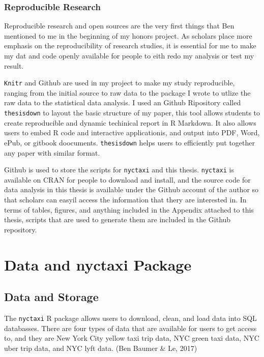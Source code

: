 \documentclass[12pt,twoside]{reedthesis}
\theoremstyle{definition}
\theoremstyle{definition}
\theoremstyle{definition}
\theoremstyle{remark}
\begin{document}
\subsection{Reproducible Research}\label{reproducible-research}

Reproducible research and open sources are the very first things that
Ben mentioned to me in the beginning of my honors project. As scholars
place more emphasis on the reproducibility of research studies, it is
essential for me to make my dat and code openly available for people to
eith redo my analysis or test my result.

\texttt{Knitr} and Github are used in my project to make my study
reproducible, ranging from the initial source to raw data to the package
I wrote to utlize the raw data to the statistical data analysis. I used
an Github Ripository called \texttt{thesisdown} to layout the basic
structure of my paper, this tool allows students to create reproducible
and dynamic techinical report in R Markdown. It also allows users to
embed R code and interactive applicationis, and output into PDF, Word,
ePub, or gitbook doocuments. \texttt{thesisdown} helps users to
efficiently put together any paper with similar format.

Github is used to store the scripts for \texttt{nyctaxi} and this
thesis. \texttt{nyctaxi} is available on CRAN for people to download and
install, and the source code for data analysis in this thesis is
available under the Github account of the author so that scholars can
easyil access the information that thery are interested in. In terms of
tables, figures, and anything included in the Appendix attached to this
thesis, scripts that are used to generate them are included in the
Github repository.

\chapter{Data and nyctaxi Package}\label{chapter2}

\section{Data and Storage}\label{data-and-storage}

The \texttt{nyctaxi} R package allows users to download, clean, and load
data into SQL databasses. There are four types of data that are
available for users to get access to, and they are New York City yellow
taxi trip data, NYC green taxi data, NYC uber trip data, and NYC lyft
data. (Ben Baumer \& Le, 2017)
\end{document}
